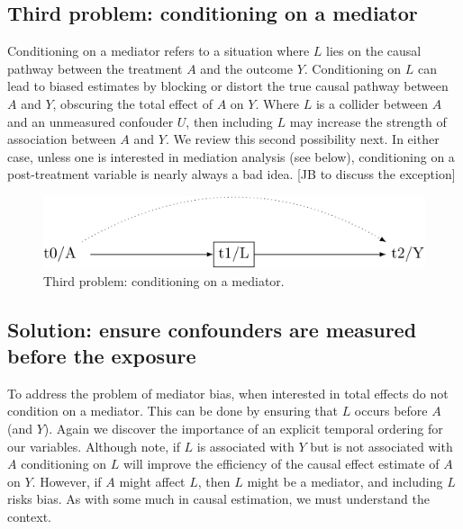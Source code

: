 \documentclass[
  singlecolumn]{report}
\begin{document}
\hypertarget{third-problem-conditioning-on-a-mediator}{%
\subsection{Third problem: conditioning on a
mediator}\label{third-problem-conditioning-on-a-mediator}}

Conditioning on a mediator refers to a situation where \(L\) lies on the
causal pathway between the treatment \(A\) and the outcome \(Y\).
Conditioning on \(L\) can lead to biased estimates by blocking or
distort the true causal pathway between \(A\) and \(Y\), obscuring the
total effect of \(A\) on \(Y\). Where \(L\) is a collider between \(A\)
and an unmeasured confouder \(U\), then including \(L\) may increase the
strength of association between \(A\) and \(Y\). We review this second
possibility next. In either case, unless one is interested in mediation
analysis (see below), conditioning on a post-treatment variable is
nearly always a bad idea. {[}JB to discuss the exception{]}

\begin{figure}

{\centering \includegraphics[width=1\textwidth,height=\textheight]{causal-dags_files/figure-pdf/fig-dag-mediator-1.pdf}

}

\caption{\label{fig-dag-mediator}Third problem: conditioning on a
mediator.}

\end{figure}

\hypertarget{solution-ensure-confounders-are-measured-before-the-exposure}{%
\subsection{Solution: ensure confounders are measured before the
exposure}\label{solution-ensure-confounders-are-measured-before-the-exposure}}

To address the problem of mediator bias, when interested in total
effects do not condition on a mediator. This can be done by ensuring
that \(L\) occurs before \(A\) (and \(Y\)). Again we discover the
importance of an explicit temporal ordering for our variables. Although
note, if \(L\) is associated with \(Y\) but is not associated with \(A\)
conditioning on \(L\) will improve the efficiency of the causal effect
estimate of \(A\) on \(Y\). However, if \(A\) might affect \(L\), then
\(L\) might be a mediator, and including \(L\) risks bias. As with some
much in causal estimation, we must understand the context.
\end{document}

